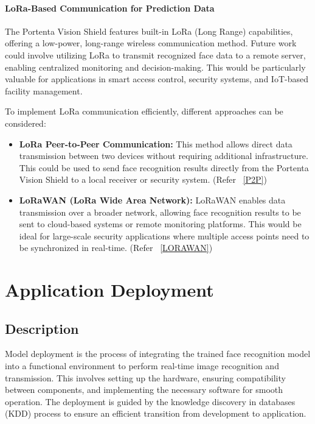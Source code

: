 \subsubsection{LoRa-Based Communication for Prediction Data}

The Portenta Vision Shield features built-in LoRa (Long Range) capabilities, offering a low-power, long-range wireless communication method. Future work could involve utilizing LoRa to transmit recognized face data to a remote server, enabling centralized monitoring and decision-making. This would be particularly valuable for applications in smart access control, security systems, and IoT-based facility management.

To implement LoRa communication efficiently, different approaches can be considered:

\begin{itemize}
	\item \textbf{LoRa Peer-to-Peer Communication:} This method allows direct data transmission between two devices without requiring additional infrastructure. This could be used to send face recognition results directly from the Portenta Vision Shield to a local receiver or security system. (Refer ~\ref{P2P})
	
	\item \textbf{LoRaWAN (LoRa Wide Area Network):} LoRaWAN enables data transmission over a broader network, allowing face recognition results to be sent to cloud-based systems or remote monitoring platforms. This would be ideal for large-scale security applications where multiple access points need to be synchronized in real-time. (Refer ~\ref{LORAWAN})
\end{itemize}


\chapter{Application Deployment}

\section{Description}
Model deployment is the process of integrating the trained face recognition model into a functional environment to perform real-time image recognition and transmission. This involves setting up the hardware, ensuring compatibility between components, and implementing the necessary software for smooth operation. The deployment is guided by the knowledge discovery in databases (KDD) process to ensure an efficient transition from development to application. \cite{IEEE:1997}

